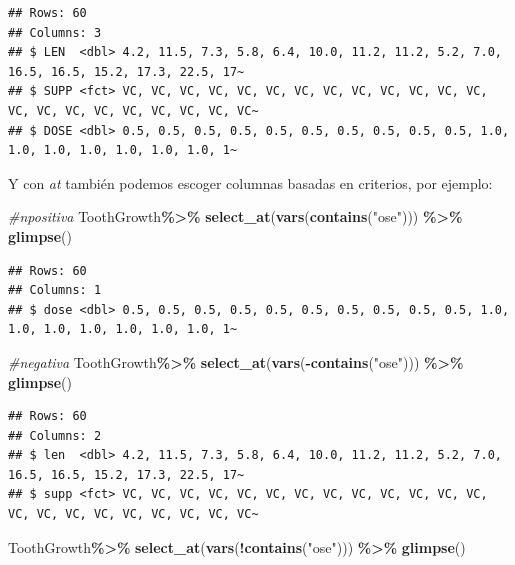 \documentclass[
]{book}
\newenvironment{Shaded}{\begin{snugshade}}{\end{snugshade}}
\newcommand{\CommentTok}[1]{\textcolor[rgb]{0.56,0.35,0.01}{\textit{#1}}}
\newcommand{\FunctionTok}[1]{\textcolor[rgb]{0.13,0.29,0.53}{\textbf{#1}}}
\newcommand{\NormalTok}[1]{#1}
\newcommand{\SpecialCharTok}[1]{\textcolor[rgb]{0.81,0.36,0.00}{\textbf{#1}}}
\newcommand{\StringTok}[1]{\textcolor[rgb]{0.31,0.60,0.02}{#1}}
\begin{document}
\begin{verbatim}
## Rows: 60
## Columns: 3
## $ LEN  <dbl> 4.2, 11.5, 7.3, 5.8, 6.4, 10.0, 11.2, 11.2, 5.2, 7.0, 16.5, 16.5, 15.2, 17.3, 22.5, 17~
## $ SUPP <fct> VC, VC, VC, VC, VC, VC, VC, VC, VC, VC, VC, VC, VC, VC, VC, VC, VC, VC, VC, VC, VC, VC~
## $ DOSE <dbl> 0.5, 0.5, 0.5, 0.5, 0.5, 0.5, 0.5, 0.5, 0.5, 0.5, 1.0, 1.0, 1.0, 1.0, 1.0, 1.0, 1.0, 1~
\end{verbatim}

\hfill\break
Y con \emph{at} también podemos escoger columnas basadas en criterios, por ejemplo:

\begin{Shaded}
\begin{Highlighting}[]
\CommentTok{\#npositiva}
\NormalTok{ToothGrowth}\SpecialCharTok{\%\textgreater{}\%} \FunctionTok{select\_at}\NormalTok{(}\FunctionTok{vars}\NormalTok{(}\FunctionTok{contains}\NormalTok{(}\StringTok{"ose"}\NormalTok{))) }\SpecialCharTok{\%\textgreater{}\%} \FunctionTok{glimpse}\NormalTok{()}
\end{Highlighting}
\end{Shaded}

\begin{verbatim}
## Rows: 60
## Columns: 1
## $ dose <dbl> 0.5, 0.5, 0.5, 0.5, 0.5, 0.5, 0.5, 0.5, 0.5, 0.5, 1.0, 1.0, 1.0, 1.0, 1.0, 1.0, 1.0, 1~
\end{verbatim}

\begin{Shaded}
\begin{Highlighting}[]
\CommentTok{\#negativa}
\NormalTok{ToothGrowth}\SpecialCharTok{\%\textgreater{}\%} \FunctionTok{select\_at}\NormalTok{(}\FunctionTok{vars}\NormalTok{(}\SpecialCharTok{{-}}\FunctionTok{contains}\NormalTok{(}\StringTok{"ose"}\NormalTok{))) }\SpecialCharTok{\%\textgreater{}\%} \FunctionTok{glimpse}\NormalTok{()}
\end{Highlighting}
\end{Shaded}

\begin{verbatim}
## Rows: 60
## Columns: 2
## $ len  <dbl> 4.2, 11.5, 7.3, 5.8, 6.4, 10.0, 11.2, 11.2, 5.2, 7.0, 16.5, 16.5, 15.2, 17.3, 22.5, 17~
## $ supp <fct> VC, VC, VC, VC, VC, VC, VC, VC, VC, VC, VC, VC, VC, VC, VC, VC, VC, VC, VC, VC, VC, VC~
\end{verbatim}

\begin{Shaded}
\begin{Highlighting}[]
\NormalTok{ToothGrowth}\SpecialCharTok{\%\textgreater{}\%} \FunctionTok{select\_at}\NormalTok{(}\FunctionTok{vars}\NormalTok{(}\SpecialCharTok{!}\FunctionTok{contains}\NormalTok{(}\StringTok{"ose"}\NormalTok{))) }\SpecialCharTok{\%\textgreater{}\%} \FunctionTok{glimpse}\NormalTok{()}
\end{Highlighting}
\end{Shaded}
\end{document}
